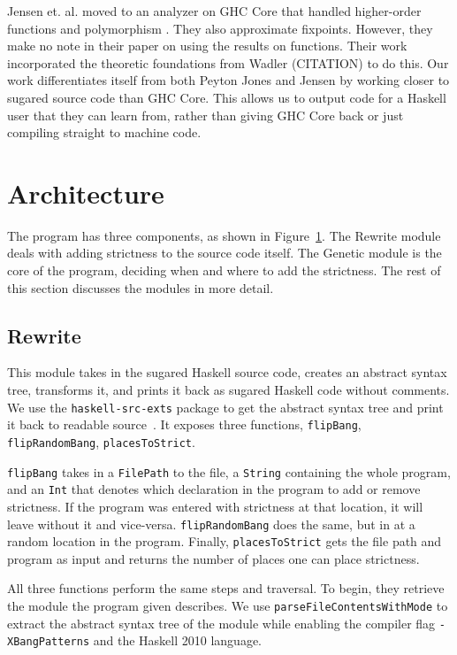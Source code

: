 \documentclass{sigplanconf}
\begin{document}
Jensen et. al. moved to an analyzer on GHC Core that handled higher-order functions and polymorphism \cite{jensen}. They also approximate fixpoints. However, they make no note in their paper on using the results on functions. Their work incorporated the theoretic foundations from Wadler (CITATION) to do this. Our work differentiates itself from both Peyton Jones and Jensen by working closer to sugared source code than GHC Core. This allows us to output code for a Haskell user that they can learn from, rather than giving GHC Core back or just compiling straight to machine code.



\section{Architecture}\label{sec:arch}
\begin{figure}
\label{fig:arch}
\end{figure}
The program has three components, as shown in Figure~\ref{fig:arch}. The Rewrite module deals with adding strictness to the source code itself. The Genetic module is the core of the program, deciding when and where to add the strictness. The rest of this section discusses the modules in more detail.
\subsection{Rewrite}
This module takes in the sugared Haskell source code, creates an abstract syntax tree, transforms it, and prints it back as sugared Haskell code without comments. We use the \lstinline!haskell-src-exts! package to get the abstract syntax tree and print it back to readable source~\cite{hsrcext}. It exposes three functions, \lstinline!flipBang!, \lstinline!flipRandomBang!, \lstinline!placesToStrict!.

\lstinline!flipBang! takes in a \lstinline!FilePath! to the file, a \lstinline!String! containing the whole program, and an \lstinline!Int! that denotes which declaration in the program to add or remove strictness. If the program was entered with strictness at that location, it will leave without it and vice-versa. \lstinline!flipRandomBang! does the same, but in at a random location in the program. Finally, \lstinline!placesToStrict! gets the file path and program as input and returns the number of places one can place strictness.

All three functions perform the same steps and traversal. To begin, they retrieve the module the program given describes. We use \lstinline!parseFileContentsWithMode! to extract the abstract syntax tree of the module while enabling the compiler flag \lstinline!-XBangPatterns! and the Haskell 2010 language. 
\end{document}

